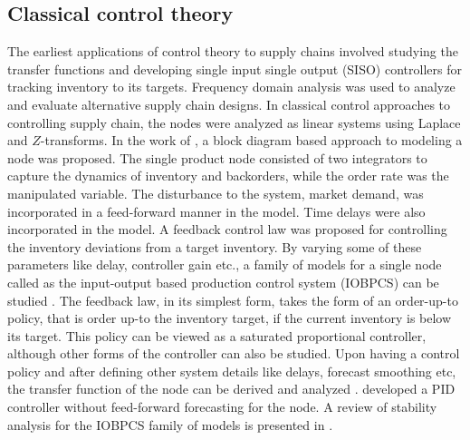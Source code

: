 \subsection*{Classical control theory}
The earliest applications of control theory to supply chains involved
studying the transfer functions and developing single input single
output (SISO) controllers for
tracking inventory to its targets. Frequency domain analysis was used
to analyze and evaluate alternative supply chain
designs. In classical control approaches to controlling supply chain,
the nodes were analyzed as linear systems using Laplace and
$Z$-transforms. In the work of \citet{Towill:1982}, a block diagram
based 
approach to modeling a node was proposed. The single product node
consisted of two integrators to capture the dynamics of inventory and
backorders, while the order rate was the
manipulated variable. The disturbance to the system, market demand,
was incorporated in a feed-forward manner in the model. Time delays were
also incorporated in the model. A feedback control law was
proposed for controlling the inventory deviations from a target
inventory. By varying some of these  parameters like delay,
controller gain etc., a family of models for a single
node called as the input-output based production control system
(IOBPCS) can be studied 
\citep{lalwani:disney:towill:2006}. The feedback law, in its simplest
form, takes the form of an order-up-to policy, that is order up-to the
inventory target, if the current inventory is below its target. This
policy can be viewed as a saturated proportional controller, although
other forms of the controller can also be studied. Upon having a
control policy and after defining other system details like
delays, forecast smoothing etc, the transfer function of the node can
be derived and analyzed
\citep{dejonckheere:disney:lambrecht:towill:2003}. 
\citet{white:1999,wikner:naim:towill:1992} 
developed a PID controller without feed-forward forecasting for the
node. A review of stability analysis for the IOBPCS family of models
is presented in \citet{disney:towill:warburton:2006}.

